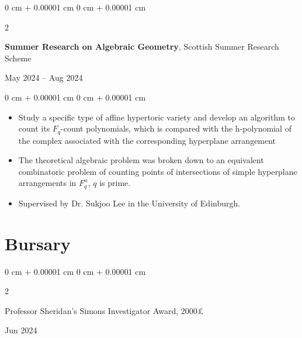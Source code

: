\documentclass[10pt, a4paper]{article}
\newenvironment{highlights}{
    \begin{itemize}[
        topsep=0.10 cm,
        parsep=0.10 cm,
        partopsep=0pt,
        itemsep=0pt,
        leftmargin=0 cm + 10pt
    ]
}{
    \end{itemize}
} %
\newenvironment{onecolentry}{
    \begin{adjustwidth}{
        0 cm + 0.00001 cm
    }{
        0 cm + 0.00001 cm
    }
}{
    \end{adjustwidth}
} %
\newenvironment{twocolentry}[2][]{
    \onecolentry
    \def\secondColumn{#2}
    \setcolumnwidth{\fill, 4.5 cm}
    \begin{paracol}{2}
}{
    \switchcolumn \raggedleft \secondColumn
    \end{paracol}
    \endonecolentry
} %
\begin{document}
        \vspace{0.2 cm}

		\begin{twocolentry}{
	            May 2024 – Aug 2024
	        }
				\textbf{Summer Research on Algebraic Geometry}, Scottish Summer Research Scheme 
			\end{twocolentry}
	        \vspace{0.10 cm}
	        \begin{onecolentry}
	            \begin{highlights}
	                \item Study a specific type of affine hypertoric variety and develop an algorithm to count its $F_q$-count polynomials, which is compared with the h-polynomial of the complex associated with the corresponding hyperplane arrangement
					\item The theoretical algebraic problem was broken down to an equivalent combinatoric problem of counting points of intersections of simple hyperplane arrangements in $F^n_q$, $q$ is prime.
					\item Supervised by Dr. Sukjoo Lee in the University of Edinburgh.
	            \end{highlights}
	        \end{onecolentry}
    
    \section{Bursary}
        
        \begin{samepage}
            \begin{twocolentry}{
                Jun 2024
            }
                Professor Sheridan's Simons Investigator Award, 2000£
            \end{twocolentry}

        \end{samepage}
\end{document}
